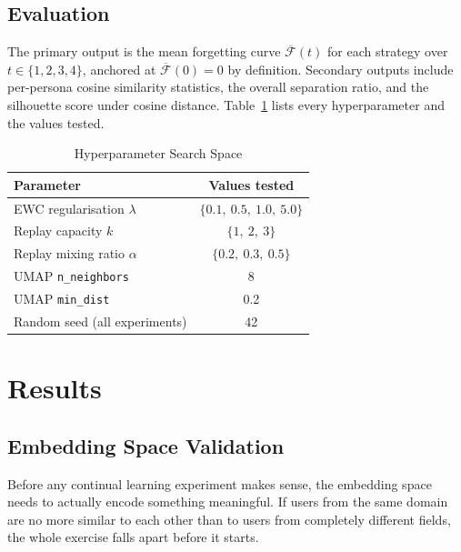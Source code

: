 \documentclass[conference]{IEEEtran}
\newcommand{\lam}{\lambda}
\newcommand{\alph}{\alpha}
\newcommand{\Fc}{\mathcal{F}}
\begin{document}
\subsection{Evaluation}

The primary output is the mean forgetting curve
$\overline{\Fc}(t)$ for each strategy over
$t \in \{1,2,3,4\}$, anchored at
$\overline{\Fc}(0) = 0$ by definition. Secondary outputs
include per-persona cosine similarity statistics, the overall
separation ratio, and the silhouette score under cosine
distance. Table~\ref{tab:hyper} lists every hyperparameter
and the values tested.

\begin{table}[t]
  \caption{Hyperparameter Search Space}
  \label{tab:hyper}
  \centering
  \renewcommand{\arraystretch}{1.3}
  \begin{tabular}{lc}
    \toprule
    \textbf{Parameter}             & \textbf{Values tested}       \\
    \midrule
    EWC regularisation $\lam$      & $\{0.1,\ 0.5,\ 1.0,\ 5.0\}$ \\
    Replay capacity $k$            & $\{1,\ 2,\ 3\}$              \\
    Replay mixing ratio $\alph$    & $\{0.2,\ 0.3,\ 0.5\}$       \\
    UMAP \texttt{n\_neighbors}     & 8                             \\
    UMAP \texttt{min\_dist}        & 0.2                           \\
    Random seed (all experiments)  & 42                            \\
    \bottomrule
  \end{tabular}
\end{table}

\section{Results}

\subsection{Embedding Space Validation}

Before any continual learning experiment makes sense, the
embedding space needs to actually encode something meaningful.
If users from the same domain are no more similar to each
other than to users from completely different fields, the
whole exercise falls apart before it starts.
\end{document}
